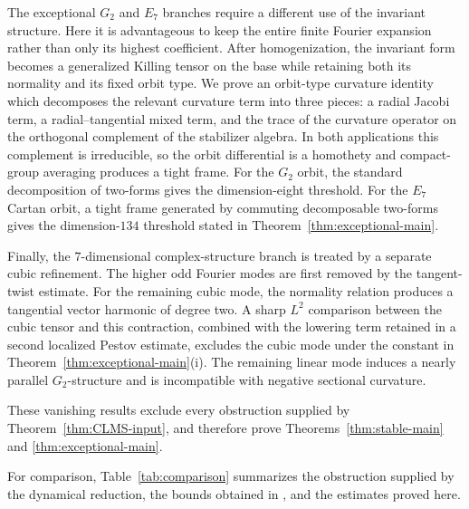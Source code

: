\documentclass[reqno,11pt]{amsart}
\theoremstyle{definition}
\begin{document}
The exceptional \(G_2\) and \(E_7\) branches require a different use of
the invariant structure.  Here it is advantageous to keep the entire
finite Fourier expansion rather than only its highest coefficient.
After homogenization, the invariant form becomes a generalized Killing
tensor on the base while retaining both its normality and its fixed
orbit type.  We prove an orbit-type curvature identity which decomposes
the relevant curvature term into three pieces: a radial Jacobi term, a
radial--tangential mixed term, and the trace of the curvature operator
on the orthogonal complement of the stabilizer algebra.  In both
applications this complement is irreducible, so the orbit differential
is a homothety and compact-group averaging produces a tight frame.
For the \(G_2\) orbit, the standard decomposition of two-forms gives the
dimension-eight threshold.  For the \(E_7\) Cartan orbit, a tight frame
generated by commuting decomposable two-forms gives the
dimension-\(134\) threshold stated in
Theorem~\ref{thm:exceptional-main}.

Finally, the $7$-dimensional complex-structure branch is treated by
a separate cubic refinement.  The higher odd Fourier modes are first
removed by the tangent-twist estimate.  For the remaining cubic mode,
the normality relation produces a tangential vector harmonic of degree
two.  A sharp \(L^2\) comparison between the cubic tensor and this
contraction, combined with the lowering term retained in a second
localized Pestov estimate, excludes the cubic mode under the constant
in Theorem~\ref{thm:exceptional-main}\textup{(i)}.  The remaining
linear mode induces a nearly parallel \(G_2\)-structure and is
incompatible with negative sectional curvature.

These vanishing results exclude every obstruction supplied by
Theorem~\ref{thm:CLMS-input}, and therefore prove
Theorems~\ref{thm:stable-main} and
\ref{thm:exceptional-main}.

For comparison, Table~\ref{tab:comparison} summarizes the obstruction supplied by
the dynamical reduction, the bounds obtained in \cite{CLMS24}, and the estimates
proved here.
\end{document}
